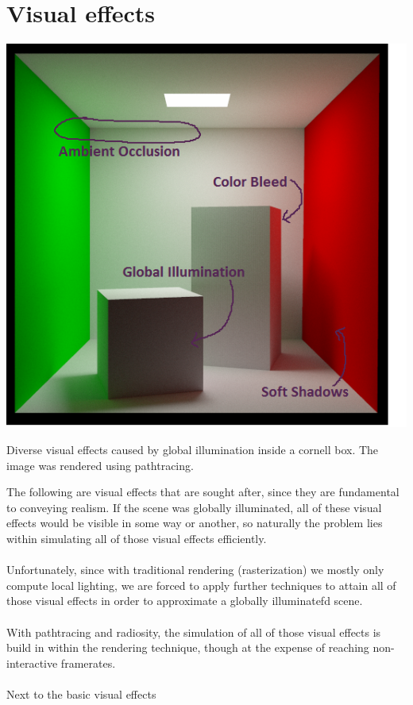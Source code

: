 \documentclass{ACGSeminar}
\begin{document}
\section{Visual effects} 
	\begin{floatingfigure}[l]{.5\textwidth} %
		\includegraphics[width=.5\textwidth]{img/visual_effects.png} %
			
		\caption{Diverse visual effects caused by global illumination inside a cornell box. The image was rendered using pathtracing.}%
		\label{fig:visual_effects}%
	\end{floatingfigure} %

	The following are visual effects that are sought after, since they are fundamental to conveying realism. If the scene was globally illuminated, all of these visual effects would be visible in some way or another, so naturally the problem lies within simulating all of those visual effects efficiently. \\\\
	Unfortunately, since with traditional rendering (rasterization) we mostly only compute local lighting, we are forced to apply further techniques to attain all of those visual effects in order to approximate a globally illuminatefd scene. \\\\
	With pathtracing and radiosity, the simulation of all of those visual effects is build in within the rendering technique, though at the expense of reaching non-interactive framerates. \\\\
	Next to the basic visual effects
\end{document}
